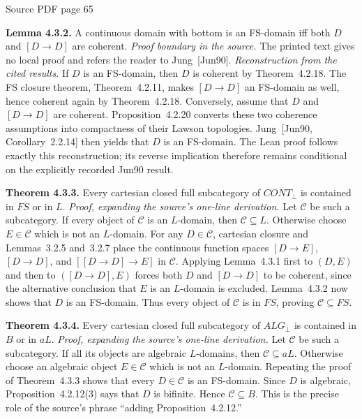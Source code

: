 \documentclass[11pt]{article}
\newcommand{\leanmarker}[2]{%
  \Needspace{3\baselineskip}%
  \marginnote{\hyperlink{#1}{\color{LeanTeal}\fbox{\scriptsize Lean}}}%
  \hypertarget{#1}{\textbf{#2.}}%
}
\newcommand{\sourcepage}[1]{\par\medskip\noindent\textcolor{SourceGray}{\scriptsize Source PDF page #1}\par\smallskip}
\begin{document}
\sourcepage{65}
\leanmarker{lemma-4-3-2}{Lemma 4.3.2} A continuous domain with bottom is an FS-domain iff both $D$ and $[D\to D]$ are coherent.
\textit{Proof boundary in the source.} The printed text gives no local proof and refers the reader to Jung~[Jun90].
\textit{Reconstruction from the cited results.} If $D$ is an FS-domain, then $D$ is coherent by Theorem~4.2.18. The FS closure theorem, Theorem~4.2.11, makes $[D\to D]$ an FS-domain as well, hence coherent again by Theorem~4.2.18. Conversely, assume that $D$ and $[D\to D]$ are coherent. Proposition~4.2.20 converts these two coherence assumptions into compactness of their Lawson topologies. Jung~[Jun90, Corollary~2.2.14] then yields that $D$ is an FS-domain. The Lean proof follows exactly this reconstruction; its reverse implication therefore remains conditional on the explicitly recorded Jun90 result.

\leanmarker{thm-4-3-3}{Theorem 4.3.3} Every cartesian closed full subcategory of $CONT_\bot$ is contained in $FS$ or in $L$.
\textit{Proof, expanding the source's one-line derivation.} Let $\mathcal C$ be such a subcategory. If every object of $\mathcal C$ is an $L$-domain, then $\mathcal C\subseteq L$. Otherwise choose $E\in\mathcal C$ which is not an $L$-domain. For any $D\in\mathcal C$, cartesian closure and Lemmas~3.2.5 and~3.2.7 place the continuous function spaces $[D\to E]$, $[D\to D]$, and $[[D\to D]\to E]$ in $\mathcal C$. Applying Lemma~4.3.1 first to $(D,E)$ and then to $([D\to D],E)$ forces both $D$ and $[D\to D]$ to be coherent, since the alternative conclusion that $E$ is an $L$-domain is excluded. Lemma~4.3.2 now shows that $D$ is an FS-domain. Thus every object of $\mathcal C$ is in $FS$, proving $\mathcal C\subseteq FS$.

\leanmarker{thm-4-3-4}{Theorem 4.3.4} Every cartesian closed full subcategory of $ALG_\bot$ is contained in $B$ or in $aL$.
\textit{Proof, expanding the source's one-line derivation.} Let $\mathcal C$ be such a subcategory. If all its objects are algebraic $L$-domains, then $\mathcal C\subseteq aL$. Otherwise choose an algebraic object $E\in\mathcal C$ which is not an $L$-domain. Repeating the proof of Theorem~4.3.3 shows that every $D\in\mathcal C$ is an FS-domain. Since $D$ is algebraic, Proposition~4.2.12(3) says that $D$ is bifinite. Hence $\mathcal C\subseteq B$. This is the precise role of the source's phrase ``adding Proposition~4.2.12.''
\end{document}

